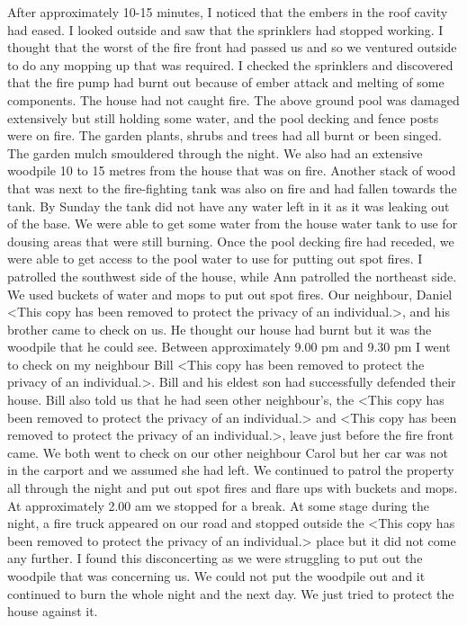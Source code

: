 \documentclass[a4paper]{article}
\begin{document}
        After approximately 10-15 minutes, I noticed that the embers in the roof cavity had eased. I looked outside and saw that the sprinklers had stopped working. I thought that the worst of the fire front had passed us and so we ventured outside to do any mopping up that was required. I checked the sprinklers and discovered that the fire pump had burnt out because of ember attack and melting of some components.
        The house had not caught fire. The above ground pool was damaged extensively but still holding some water, and the pool decking and fence posts were on fire. The garden plants, shrubs and trees had all burnt or been singed. The garden mulch smouldered through the night. We also had an extensive woodpile 10 to 15 metres from the house that was on fire. Another stack of wood that was next to the fire-fighting tank was also on fire and had fallen towards the tank. By Sunday the tank did not have any water left in it as it was leaking out of the base.
        We were able to get some water from the house water tank to use for dousing areas that were still burning. Once the pool decking fire had receded, we were able to get access to the pool water to use for putting out spot fires.
        I patrolled the southwest side of the house, while Ann patrolled the northeast side. We used buckets of water and mops to put out spot fires.
        Our neighbour, Daniel <This copy has been removed to protect the privacy of an individual.>, and his brother came to check on us. He thought our house had burnt but it was the woodpile that he could see.
        Between approximately 9.00 pm and 9.30 pm I went to check on my neighbour Bill <This copy has been removed to protect the privacy of an individual.>. Bill and his eldest son had successfully defended their house. Bill also told us that he had seen other neighbour's, the <This copy has been removed to protect the privacy of an individual.> and <This copy has been removed to protect the privacy of an individual.>, leave just before the fire front came. We both went to check on our other neighbour Carol but her car was not in the carport and we assumed she had left.
        We continued to patrol the property all through the night and put out spot fires and flare ups with buckets and mops. At approximately 2.00 am we stopped for a break.
        At some stage during the night, a fire truck appeared on our road and stopped outside the <This copy has been removed to protect the privacy of an individual.> place but it did not come any further. I found this disconcerting as we were struggling to put out the woodpile that was concerning us. We could not put the woodpile out and it continued to burn the whole night and the next day. We just tried to protect the house against it.
\end{document}

